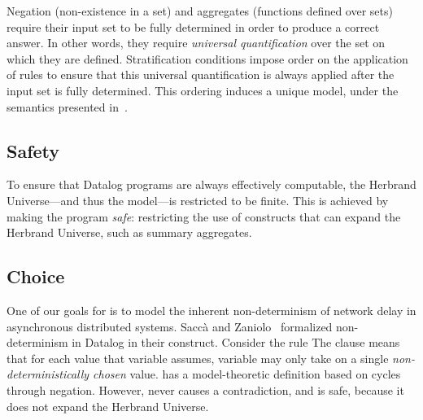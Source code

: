Negation (non-existence in a set) and aggregates (functions defined over sets)
require their input set to be fully determined in order to produce a correct
answer.  In other words, they require {\em universal quantification} over the
set on which they are defined.  Stratification conditions impose order on the
application of rules to ensure that this universal quantification is always
applied after the input set is fully determined.  This ordering induces a
unique model, under the semantics presented in~\cite{wellfounded}.

\subsection{Safety}

To ensure that Datalog programs are always effectively computable, the Herbrand
Universe---and thus the model---is restricted to be finite.  This is
achieved by making the program {\em safe}: restricting the use of constructs
that can expand the Herbrand Universe, such as summary aggregates.


\subsection{Choice}

One of our goals for \lang is to model the inherent non-determinism of network
delay in asynchronous distributed systems.  Sacc\`{a} and
Zaniolo~\cite{sacca-zaniolo} formalized non-determinism in Datalog in their
 construct.  Consider the rule  The  clause means that for each
value that variable  assumes, variable  may only take on
a single {\em non-deterministically chosen} value.   has a
model-theoretic definition based on cycles through negation.  However, 
never causes a contradiction, and is safe, because it does not expand the
Herbrand Universe.

